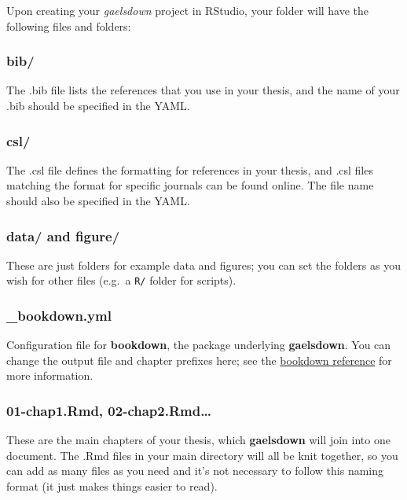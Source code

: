 \documentclass[12pt, oneside]{queensuthesis}
\numberwithin{equation}{chapter}       %
\begin{document}
Upon creating your \emph{gaelsdown} project in RStudio, your folder will have the following files and folders:

\hypertarget{bib}{%
\subsubsection{bib/}\label{bib}}

The .bib file lists the references that you use in your thesis, and the name of your .bib should be specified in the YAML.

\hypertarget{csl}{%
\subsubsection{csl/}\label{csl}}

The .csl file defines the formatting for references in your thesis, and .csl files matching the format for specific journals can be found online. The file name should also be specified in the YAML.

\hypertarget{data-and-figure}{%
\subsubsection{data/ and figure/}\label{data-and-figure}}

These are just folders for example data and figures; you can set the folders as you wish for other files (e.g.~a \texttt{R/} folder for scripts).

\hypertarget{bookdown.yml}{%
\subsubsection{\_bookdown.yml}\label{bookdown.yml}}

Configuration file for \textbf{bookdown}, the package underlying \textbf{gaelsdown}. You can change the output file and chapter prefixes here; see the \href{https://bookdown.org/yihui/bookdown/configuration.html}{bookdown reference} for more information.

\hypertarget{chap1.rmd-02-chap2.rmd}{%
\subsubsection{01-chap1.Rmd, 02-chap2.Rmd\ldots{}}\label{chap1.rmd-02-chap2.rmd}}

These are the main chapters of your thesis, which \textbf{gaelsdown} will join into one document. The .Rmd files in your main directory will all be knit together, so you can add as many files as you need and it's not necessary to follow this naming format (it just makes things easier to read).
\end{document}
